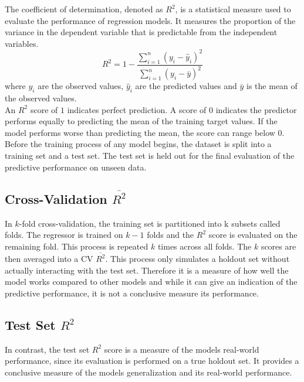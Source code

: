 The coefficient of determination, denoted as $R^2$, is a statistical measure used to evaluate the performance of regression models. It measures the proportion of the variance in the dependent variable that is predictable from the independent variables. 
\begin{equation}
R^2 = 1 - \frac{\sum_{i=1}^n (y_i - \hat{y}_i)^2}{\sum_{i=1}^n (y_i - \bar{y})^2}
\end{equation}
where $y_i$ are the observed values, $\hat{y}_i$ are the predicted values and $\bar{y}$ is the mean of the observed values. \\
An $R^2$ score of $1$ indicates perfect prediction. A score of $0$ indicates the predictor performs equally to predicting the mean of the training target values. If the model performs worse than predicting the mean, the score can range below $0$. \\
Before the training process of any model begins, the dataset is split into a training set and a test set. The test set is held out for the final evaluation of the predictive performance on unseen data.


\subsection{Cross-Validation $\overline{R^2}$}
In $k$-fold cross-validation, the training set is partitioned into k subsets called folds. The regressor is trained on $k-1$ folds and the $R^2$ score is evaluated on the remaining fold. This process is repeated $k$ times across all folds. The $k$ scores are then averaged into a CV $\overline{R^2}$. This process only simulates a holdout set without actually interacting with the test set. Therefore it is a measure of how well the model works compared to other models and while it can give an indication of the predictive performance, it is not a conclusive measure its performance.

\subsection{Test Set $R^2$}
In contrast, the test set $R^2$ score is a measure of the models real-world performance, since its evaluation is performed on a true holdout set. It provides a conclusive measure of the models generalization and its real-world performance.
